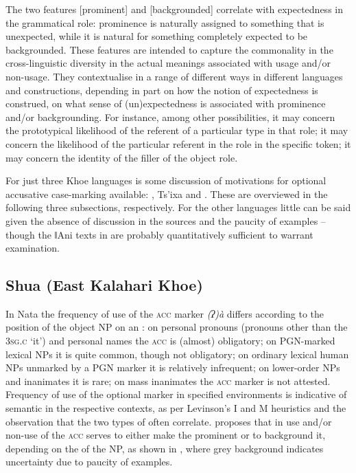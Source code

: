 \documentclass[output=paper]{LSP/langsci}
\begin{document}
The two features [prominent] and [backgrounded] correlate with expectedness in the grammatical role: prominence is naturally assigned to something that is unexpected, while it is natural for something completely expected to be backgrounded. These features are intended to capture the commonality in the cross-linguistic diversity in the actual meanings associated with usage and/or non-usage. They contextualise in a range of different ways in different languages and constructions, depending in part on how the notion of expectedness is construed, on what sense of (un)expectedness is associated with prominence and/or backgrounding. For instance, among other possibilities, it may concern the prototypical likelihood of the referent of a particular type in that role; it may concern the likelihood of the particular referent in the role in the specific token; it may concern the identity of the filler of the object role.

For just three Khoe languages is some discussion of motivations for optional accusative case-marking available:  \citep{McGregor2015Optional}, Ts’ixa \citep{Fehn2014Grammar} and  \citep{Kilian-Hatz2008Grammar,Kilian-Hatz2013Kxoe}. These are overviewed in the following three subsections, respectively. For the other languages little can be said given the absence of discussion in the sources and the paucity of examples – though the ǁAni texts in \citet{Heine1999Ani} are probably quantitatively sufficient to warrant examination.


\subsection{Shua (East Kalahari Khoe)} \label{09-mc-sec:3-1} 

In Nata  the frequency of use of the \textsc{acc} marker \textit{(ʔ)à} differs according to the position of the object NP on an  \citep{McGregor2015Optional}: on personal pronouns (\ie pronouns other than the 3\textsc{sg.c} ‘it’) and personal names the \textsc{acc} is (almost) obligatory; on PGN-marked lexical NPs it is quite common, though not obligatory; on ordinary lexical human NPs unmarked by a PGN marker it is relatively infrequent; on lower-order  NPs and inanimates it is rare; on mass inanimates the \textsc{acc} marker is not attested. Frequency of use of the optional marker in specified environments is indicative of semantic  in the respective contexts, as per Levinson’s I and M heuristics \citep{Levinson2000Presumptive} and the observation that the two types of  often correlate. \citet{McGregor2015Optional} proposes that in  use and/or non-use of the \textsc{acc} serves to either make the  prominent or to background it, depending on the  of the  NP, as shown in , where grey background indicates uncertainty due to paucity of examples.
\end{document}

